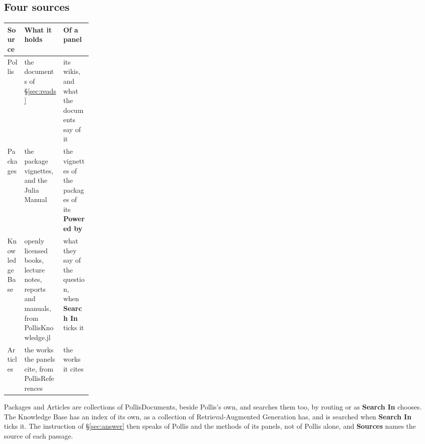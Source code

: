 \subsection{Four sources}
\begin{center}\small
\renewcommand{\arraystretch}{1.25}
\begin{tabularx}{\linewidth}{@{}p{0.2\linewidth}LL@{}}
\toprule
\textbf{Source} & \textbf{What it holds} & \textbf{Of a panel}\\
\midrule
Pollis & the documents of \S\ref{sec:reads} & its wikis, and what the documents say of it\\
Packages & the package vignettes, and the Julia Manual & the vignettes of the packages of its \textbf{Powered by}\\
Knowledge Base & openly licensed books, lecture notes, reports and manuals, from PollisKnowledge.jl & what they
  say of the question, when \textbf{Search In} ticks it\\
Articles & the works the panels cite, from PollisReferences & the works it cites\\
\bottomrule
\end{tabularx}
\end{center}
Packages and Articles are collections of PollisDocuments, beside Pollis's own, and 
searches them too, by routing or as \textbf{Search In} chooses. The Knowledge Base has an index of its own, as a
collection of Retrieval-Augmented Generation has, and is searched when \textbf{Search In} ticks it. The instruction of \S\ref{sec:answer} then speaks of Pollis and the
methods of its panels, not of Pollis alone, and \textbf{Sources} names the source of each passage.

